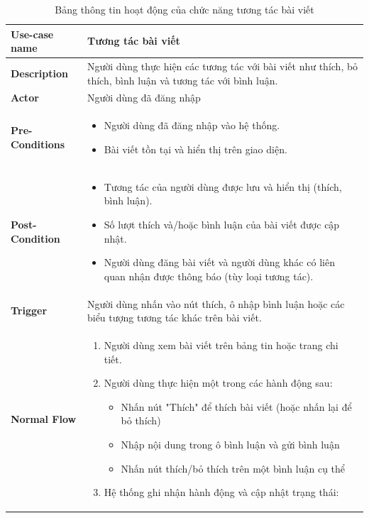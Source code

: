 \begin{longtable}{|>{\bfseries}m{4cm}|m{10cm}|}
    \caption{Bảng thông tin hoạt động của chức năng tương tác bài viết}
    \label{table:usecase-interact}\\
\hline
Use-case name & Tương tác bài viết \\
\hline
Description & Người dùng thực hiện các tương tác với bài viết như thích, bỏ thích, bình luận và tương tác với bình luận. \\
\hline
Actor & Người dùng đã đăng nhập \\
\hline
Pre-Conditions & 
\begin{itemize}
    \item Người dùng đã đăng nhập vào hệ thống.
    \item Bài viết tồn tại và hiển thị trên giao diện.
\end{itemize} \\
\hline
Post-Condition & 
\begin{itemize}
    \item Tương tác của người dùng được lưu và hiển thị (thích, bình luận).
    \item Số lượt thích và/hoặc bình luận của bài viết được cập nhật.
    \item Người dùng đăng bài viết và người dùng khác có liên quan nhận được thông báo (tùy loại tương tác).
\end{itemize} \\
\hline
Trigger & Người dùng nhấn vào nút thích, ô nhập bình luận hoặc các biểu tượng tương tác khác trên bài viết. \\
\hline
Normal Flow &
\begin{enumerate}
    \item Người dùng xem bài viết trên bảng tin hoặc trang chi tiết.
    \item Người dùng thực hiện một trong các hành động sau:
       \begin{itemize}
         \item Nhấn nút "Thích" để thích bài viết (hoặc nhấn lại để bỏ thích)
         \item Nhập nội dung trong ô bình luận và gửi bình luận
         \item Nhấn nút thích/bỏ thích trên một bình luận cụ thể
       \end{itemize}
    \item Hệ thống ghi nhận hành động và cập nhật trạng thái:
       \begin{itemize}

\end{itemize}
\end{enumerate}
\end{longtable}

